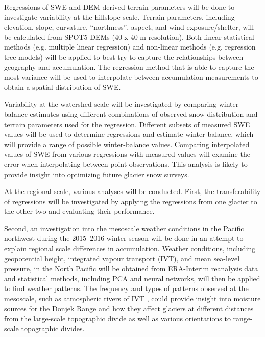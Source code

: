 \documentclass[12pt]{article}
\begin{document}
Regressions of SWE and DEM-derived terrain parameters will be done to investigate variability at the hillslope scale. Terrain parameters, including elevation, slope, curvature, ``northness'', aspect, and wind exposure/shelter, will be calculated from SPOT5 DEMs (40 x 40 m resolution). Both linear statistical methods (e.g. multiple linear regression) and non-linear methods (e.g. regression tree models) will be applied to best try to capture the relationships between geography and accumulation. The regression method that is able to capture the most variance will be used to interpolate between accumulation measurements to obtain a spatial distribution of SWE. 

Variability at the watershed scale will be investigated by comparing winter balance estimates using different combinations of observed snow distribution and terrain parameters used for the regression. Different subsets of measured SWE values will be used to determine regressions and estimate winter balance, which will provide a range of possible winter-balance values. Comparing interpolated values of SWE from various regressions with measured values will examine the error when interpolating between point observations. This analysis is likely to provide insight into optimizing future glacier snow surveys.

At the regional scale, various analyses will be conducted. First, the transferability of regressions will be investigated by applying the regressions from one glacier to the other two and evaluating their performance. 

Second, an investigation into the mesoscale weather conditions in the Pacific northwest during the 2015--2016 winter season will be done in an attempt to explain regional scale differences in accumulation. Weather conditions, including geopotential height, integrated vapour transport (IVT), and mean sea-level pressure, in the North Pacific will be obtained from ERA-Interim reanalysis data and statistical methods, including PCA and neural networks, will then be applied to find weather patterns. The frequency and types of patterns observed at the mesoscale, such as atmospheric rivers of IVT \citep{Neiman2008, Roberge2009}, could provide insight into moisture sources for the Donjek Range and how they affect glaciers at different distances from the large-scale topographic divide as well as various orientations to range-scale topographic divides. 
\end{document}
